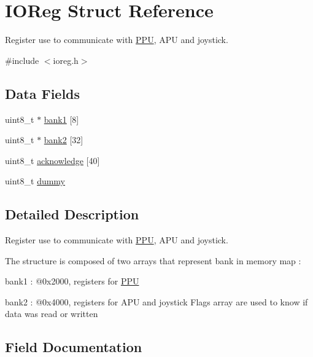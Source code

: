 \hypertarget{struct_i_o_reg}{}\section{I\+O\+Reg Struct Reference}
\label{struct_i_o_reg}


Register use to communicate with \hyperlink{struct_p_p_u}{P\+PU}, A\+PU and joystick.  




{\ttfamily \#include $<$ioreg.\+h$>$}

\subsection*{Data Fields}
\begin{DoxyCompactItemize}
\item 
uint8\+\_\+t $\ast$ \hyperlink{struct_i_o_reg_a3a254f17251e937f76932c5081eab405}{bank1} \mbox{[}8\mbox{]}
\item 
uint8\+\_\+t $\ast$ \hyperlink{struct_i_o_reg_ae4edb3d07789e7300d9f7ff80927814a}{bank2} \mbox{[}32\mbox{]}
\item 
uint8\+\_\+t \hyperlink{struct_i_o_reg_a33f1fe95e68d8c8ce672496d8d2f9db3}{acknowledge} \mbox{[}40\mbox{]}
\item 
uint8\+\_\+t \hyperlink{struct_i_o_reg_aff7b59f569ec689a7580bd6911daafd5}{dummy}
\end{DoxyCompactItemize}


\subsection{Detailed Description}
Register use to communicate with \hyperlink{struct_p_p_u}{P\+PU}, A\+PU and joystick. 

The structure is composed of two arrays that represent bank in memory map \+:
\begin{DoxyItemize}
\item bank1 \+: @0x2000, registers for \hyperlink{struct_p_p_u}{P\+PU}
\item bank2 \+: @0x4000, registers for A\+PU and joystick Flags array are used to know if data was read or written 
\end{DoxyItemize}

\subsection{Field Documentation}
\mbox{\label{struct_i_o_reg_a33f1fe95e68d8c8ce672496d8d2f9db3}} 
